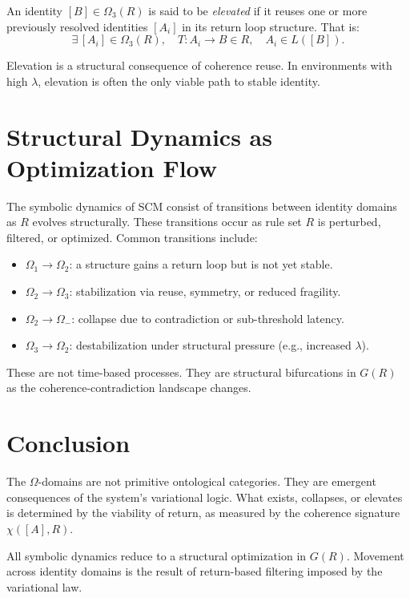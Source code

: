 \begin{definition}[Elevation]
An identity $[B] \in \Omega_3(R)$ is said to be \emph{elevated} if it reuses one or more previously resolved identities $[A_i]$ in its return loop structure. That is:
\[
\exists\, [A_i] \in \Omega_3(R), \quad T: A_i \to B \in R, \quad A_i \in L([B]).
\]
\end{definition}

\noindent
Elevation is a structural consequence of coherence reuse. In environments with high $\lambda$, elevation is often the only viable path to stable identity.

\section{Structural Dynamics as Optimization Flow}

The symbolic dynamics of SCM consist of transitions between identity domains as $R$ evolves structurally. These transitions occur as rule set $R$ is perturbed, filtered, or optimized. Common transitions include:

\begin{itemize}
    \item $\Omega_1 \to \Omega_2$: a structure gains a return loop but is not yet stable.
    \item $\Omega_2 \to \Omega_3$: stabilization via reuse, symmetry, or reduced fragility.
    \item $\Omega_2 \to \Omega_{-}$: collapse due to contradiction or sub-threshold latency.
    \item $\Omega_3 \to \Omega_2$: destabilization under structural pressure (e.g., increased $\lambda$).
\end{itemize}

\noindent
These are not time-based processes. They are structural bifurcations in $G(R)$ as the coherence-contradiction landscape changes.

\section{Conclusion}

The $\Omega$-domains are not primitive ontological categories. They are emergent consequences of the system’s variational logic. What exists, collapses, or elevates is determined by the viability of return, as measured by the coherence signature $\chi([A], R)$.

All symbolic dynamics reduce to a structural optimization in $G(R)$. Movement across identity domains is the result of return-based filtering imposed by the variational law.

